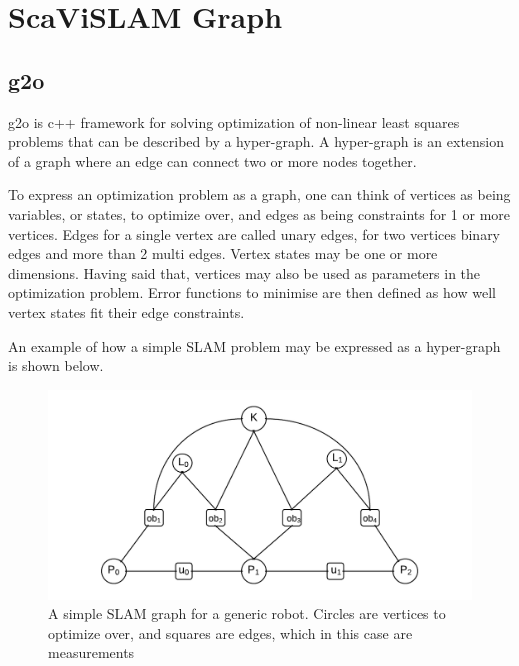 \section{ScaViSLAM Graph}
\label{sec:scavislam_graph}

\subsection{g2o}

g2o is c++ framework for solving optimization of non-linear least squares problems that can be described by a hyper-graph. A hyper-graph is an extension of a graph where an edge can connect two or more nodes together. 

To express an optimization problem as a graph, one can think of vertices as being variables, or states, to optimize over, and edges as being constraints for 1 or more vertices.  Edges for a single vertex are called unary edges, for two vertices binary edges and more than 2 multi edges.  Vertex states may be one or more dimensions.  Having said that, vertices may also be used as parameters in the optimization problem.  Error functions to minimise are then defined as how well vertex states fit their edge constraints.

An example of how a simple SLAM problem may be expressed as a hyper-graph is shown below.
\begin{figure}[h]
  \centering
      \includegraphics[width=1.0\textwidth]{chapters/images/simple_slam}
  \caption{A simple SLAM graph for a generic robot.  Circles are vertices to optimize over, and
squares are edges, which in this case are measurements}
\end{figure}


